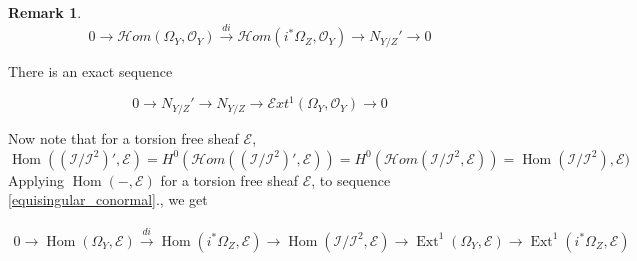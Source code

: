 \documentclass[11pt,twoside]{amsart}
\theoremstyle{plain}
\numberwithin{equation}{section}
\theoremstyle{definition}
\newtheorem{remark}[theorem]{Remark}
\begin{document}
\begin{remark}
$$ 0 \to \mathcal{H}om(\Omega_Y, \mathcal{O}_Y) \xrightarrow{di}   \mathcal{H}om(i^*\Omega_Z, \mathcal{O}_Y) \to N_{Y/Z}' \to 0$$

There is an exact sequence 

$$0 \to N_{Y/Z}' \to N_{Y/Z} \to \mathcal{E}xt^1(\Omega_Y, \mathcal{O}_Y) \to 0$$

Now note that for a torsion free sheaf $\mathcal{E}$, $\operatorname{Hom}((\mathcal{I}/\mathcal{I}^2)', \mathcal{E}) = H^0(\mathcal{H}om((\mathcal{I}/\mathcal{I}^2)', \mathcal{E})) = H^0(\mathcal{H}om(\mathcal{I}/\mathcal{I}^2, \mathcal{E})) =  \operatorname{Hom}(\mathcal{I}/\mathcal{I}^2), \mathcal{E})$
Applying $\operatorname{Hom}(-, \mathcal{E})$ for a torsion free sheaf $\mathcal{E}$, to sequence \ref{equisingular_conormal}., we get 

\begin{align}\label{counting_reflexive_ribbons}
0 \to \operatorname{Hom}(\Omega_Y, \mathcal{E}) \xrightarrow{di}   \operatorname{Hom}(i^*\Omega_Z, \mathcal{E}) \to \operatorname{Hom}(\mathcal{I}/\mathcal{I}^2, \mathcal{E}) \to \operatorname{Ext}^1(\Omega_Y, \mathcal{E}) \to \operatorname{Ext}^1(i^*\Omega_Z, \mathcal{E}) 
\end{align}

\end{remark}
\end{document}
